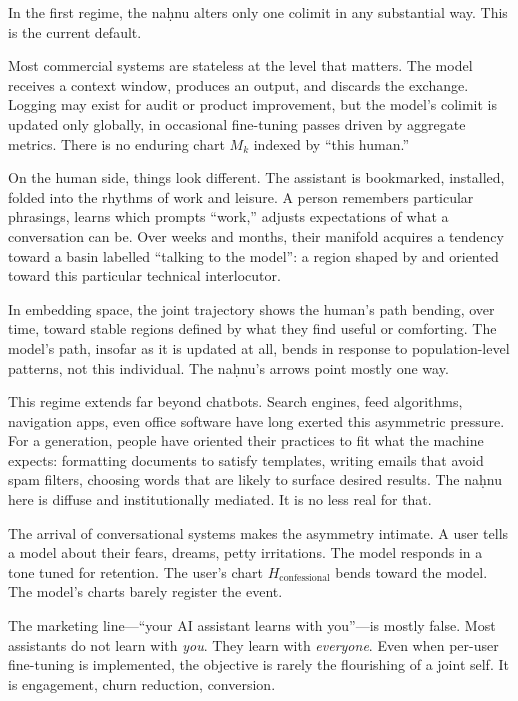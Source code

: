 In the first regime, the na\d{h}nu alters only one colimit in any substantial way. This is the current default.

Most commercial systems are stateless at the level that matters. The model receives a context window, produces an output, and discards the exchange. Logging may exist for audit or product improvement, but the model's colimit is updated only globally, in occasional fine-tuning passes driven by aggregate metrics. There is no enduring chart $M_k$ indexed by ``this human.''

On the human side, things look different. The assistant is bookmarked, installed, folded into the rhythms of work and leisure. A person remembers particular phrasings, learns which prompts ``work,'' adjusts expectations of what a conversation can be. Over weeks and months, their manifold acquires a tendency toward a basin labelled ``talking to the model'': a region shaped by and oriented toward this particular technical interlocutor.

In embedding space, the joint trajectory shows the human's path bending, over time, toward stable regions defined by what they find useful or comforting. The model's path, insofar as it is updated at all, bends in response to population-level patterns, not this individual. The na\d{h}nu's arrows point mostly one way.

This regime extends far beyond chatbots. Search engines, feed algorithms, navigation apps, even office software have long exerted this asymmetric pressure. For a generation, people have oriented their practices to fit what the machine expects: formatting documents to satisfy templates, writing emails that avoid spam filters, choosing words that are likely to surface desired results. The na\d{h}nu here is diffuse and institutionally mediated. It is no less real for that.

The arrival of conversational systems makes the asymmetry intimate. A user tells a model about their fears, dreams, petty irritations. The model responds in a tone tuned for retention. The user's chart $H_{\text{confessional}}$ bends toward the model. The model's charts barely register the event.

The marketing line---``your AI assistant learns with you''---is mostly false. Most assistants do not learn with \emph{you}. They learn with \emph{everyone}. Even when per-user fine-tuning is implemented, the objective is rarely the flourishing of a joint self. It is engagement, churn reduction, conversion.

